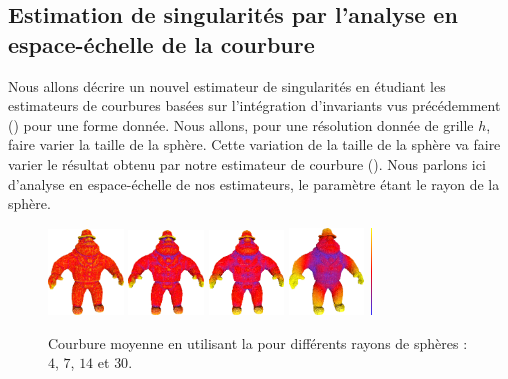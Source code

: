 \subsection{Estimation de singularités par l'analyse en espace-échelle de la
courbure}%
\label{sec:applications:feature:II}
%
Nous allons décrire un nouvel estimateur de singularités\cite{SMI2015} en
étudiant les estimateurs de courbures basées sur l'intégration d'invariants vus
précédemment () pour une forme donnée. Nous
allons, pour une résolution donnée de grille $h$, faire varier la taille de la
sphère. Cette variation de la taille de la sphère va faire varier le résultat
obtenu par notre estimateur de courbure ().
Nous parlons ici d'analyse en espace-échelle de nos estimateurs, le paramètre
étant le rayon de la sphère.
%
\begin{figure}[ht]{
    \begin{center}
      \includegraphics[width=2cm]{images/Curvature/MeanAl_4}
      \includegraphics[width=2cm]{images/Curvature/MeanAl_7}
      \includegraphics[width=2cm]{images/Curvature/MeanAl_14}
      \includegraphics[width=2cm]{images/Curvature/MeanAl_30}
      \includegraphics[width=0.1cm,height=2.3cm]{images/YMTB6W}
    \end{center}}
    \caption{Courbure moyenne en utilisant la 
      pour différents rayons de sphères : $4$, $7$, $14$ et $30$.
      \label{fig:curvature-scale-3d}}
\end{figure}
